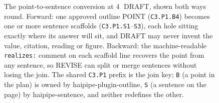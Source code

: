 \begin{figure}[t]
  \centering
  
  \caption{The point-to-sentence conversion at \textcircled{\scriptsize 4}
  DRAFT, shown both ways round. Forward: one approved outline POINT
  (\texttt{C3.P1.B4}) becomes one or more sentence scaffolds
  (\texttt{C3.P1.S1}--\texttt{S3}), each hole sitting exactly where its answer
  will sit, and DRAFT may never invent the value, citation, reading or figure.
  Backward: the machine-readable \texttt{realizes:} comment on each scaffold
  line recovers the point from any sentence, so REVISE can split or merge
  sentences without losing the join. The shared \texttt{C3.P1} prefix is the
  join key; \texttt{B} (a point in the plan) is owned by
  haipipe-plugin-outline, \texttt{S} (a sentence on the page) by
  haipipe-sentence, and neither redefines the other.}
  \label{fig:qpw00-point-to-sentence}
\end{figure}
